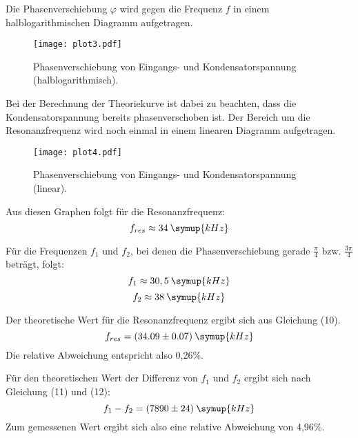 Die Phasenverschiebung $\varphi$ wird gegen die Frequenz $f$ in einem halblogarithmischen
Diagramm aufgetragen.

\begin{figure}[H]
  \centering
  \texttt{[image: plot3.pdf]}
  \caption{Phasenverschiebung von Eingangs- und Kondensatorspannung (halblogarithmisch).}
  \label{fig:plot3}
\end{figure}



Bei der Berechnung der Theoriekurve ist dabei zu beachten, dass die Kondensatorspannung
bereits phasenverschoben ist.
Der Bereich um die Resonanzfrequenz wird noch einmal in einem linearen Diagramm aufgetragen.

\begin{figure}[H]
  \centering
  \texttt{[image: plot4.pdf]}
  \caption{Phasenverschiebung von Eingangs- und Kondensatorspannung (linear).}
  \label{fig:plot4}
\end{figure}

Aus diesen Graphen folgt für die Resonanzfrequenz:
\begin{equation*}
  f_{res} \approx 34 \:\symup{kHz}
\end{equation*}

Für die Frequenzen $f_1$ und $f_2$, bei denen die Phasenverschiebung gerade
$\frac{\pi}{4}$ bzw. $\frac{3\pi}{4}$ beträgt, folgt:
\begin{equation*}
  f_1 \approx 30,5 \:\symup{kHz}
\end{equation*}
\begin{equation*}
  f_2 \approx 38 \:\symup{kHz}
\end{equation*}

Der theoretische Wert für die Resonanzfrequenz ergibt sich aus Gleichung (10).
\begin{equation*}
  f_{res} = (34.09 \pm 0.07) \:\symup{kHz}
\end{equation*}
Die relative Abweichung entspricht also 0,26\%.

Für den theoretischen Wert der Differenz von $f_1$ und $f_2$ ergibt sich nach
Gleichung (11) und (12):
\begin{equation*}
  f_1 - f_2 = (7890 \pm 24) \:\symup{kHz}
\end{equation*}
Zum gemessenen Wert ergibt sich also eine relative Abweichung von 4,96\%.
